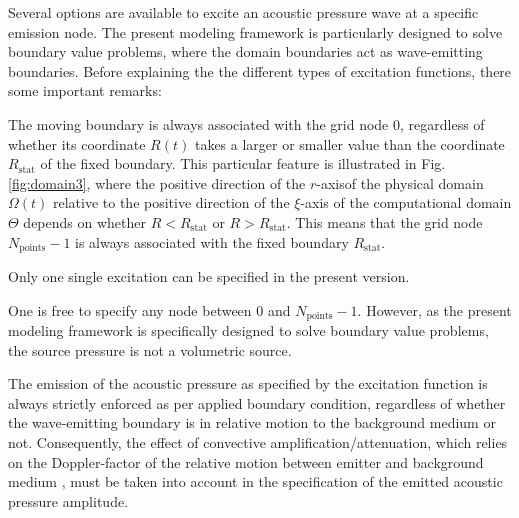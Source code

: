 Several options are available to excite an acoustic pressure wave at a specific emission node. The present modeling framework is particularly designed to solve boundary value problems, where the domain boundaries act as wave-emitting boundaries. Before explaining the the different types of excitation functions, there some important remarks:

\begin{compactitem}
\item The moving boundary is always associated with the grid node 0, regardless of whether its coordinate $R\left(t\right)$ takes a larger or smaller value than the coordinate $R_{\mathrm{stat}}$ of the fixed boundary. This particular feature is illustrated in Fig. \ref{fig:domain3}, where the positive direction of the $r$-axisof the physical domain $\Omega\left(t\right)$ relative to the positive direction of the $\xi$-axis of the computational domain $\Theta$ depends on whether $R<R_{\mathrm{stat}}$ or $R>R_{\mathrm{stat}}$. This means that the grid node $N_{\mathrm{points}}-1$ is always associated with the fixed boundary $R_{\mathrm{stat}}$.
\item Only one single excitation can be specified in the present version.
\item One is free to specify any node between $0$ and $N_{\mathrm{points}}-1$. However, as the present modeling framework is specifically designed to solve boundary value problems, the source pressure is not a volumetric source.
\item The emission of the acoustic pressure as specified by the excitation function is always strictly enforced as per applied boundary condition, regardless of whether the wave-emitting boundary is in relative motion to the background medium or not. Consequently, the effect of convective amplification/attenuation, which relies on the Doppler-factor of the relative motion between emitter and background medium \citep{Ostashev_et_al_2005}, must be taken into account in the specification of the emitted acoustic pressure amplitude.
\end{compactitem}

